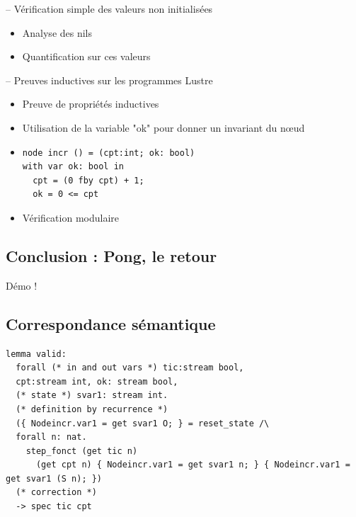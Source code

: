 \documentclass[11pt,usenames,dvipsnames]{beamer}
\begin{document}
\begin{frame}{-- Vérification simple des valeurs non initialisées}
	\begin{itemize}
		\item Analyse des nils
		\item Quantification sur ces valeurs
	\end{itemize}
\end{frame}


\begin{frame}[fragile]{-- Preuves inductives sur les programmes Lustre}
	\begin{itemize}
		\item Preuve de propriétés inductives
		\item Utilisation de la variable "ok" pour donner un invariant du nœud
		\item
		  \begin{lstlisting}[language=minils]
node incr () = (cpt:int; ok: bool)
with var ok: bool in
  cpt = (0 fby cpt) + 1;
  ok = 0 <= cpt\end{lstlisting}
		\item Vérification modulaire
	\end{itemize}
\end{frame}

\subsection{Conclusion : Pong, le retour}
\begin{frame}{\null}
\centering \Large Démo !
\end{frame}



\appendix

\subsection{Correspondance sémantique}
\begin{frame}[fragile]{\null}
  \begin{lstlisting}[language=why3]
lemma valid:
  forall (* in and out vars *) tic:stream bool,
  cpt:stream int, ok: stream bool,
  (* state *) svar1: stream int.
  (* definition by recurrence *)
  ({ Nodeincr.var1 = get svar1 O; } = reset_state /\
  forall n: nat.
    step_fonct (get tic n)
      (get cpt n) { Nodeincr.var1 = get svar1 n; } { Nodeincr.var1 = get svar1 (S n); })
  (* correction *)
  -> spec tic cpt\end{lstlisting}
\end{frame}
\end{document}
